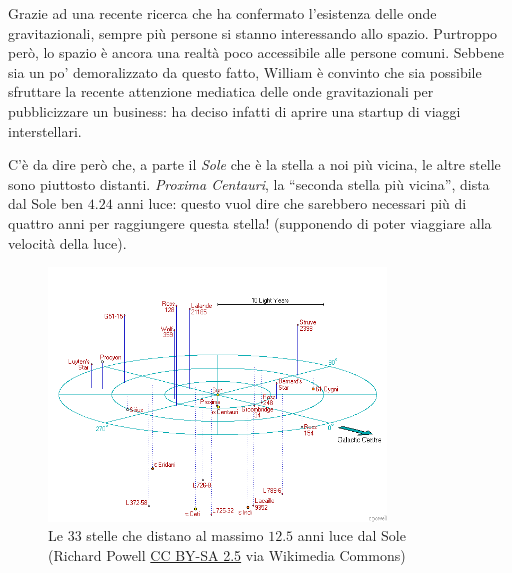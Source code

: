 \usepackage{xcolor}
\usepackage{afterpage}
\usepackage{hyperref}
\usepackage{caption}
\usepackage{pifont,mdframed}
\usepackage[bottom]{footmisc}

\makeatletter
\gdef\this@inputfilename{input.txt}
\gdef\this@outputfilename{output.txt}
\makeatother

\newcommand{\inputfile}{\texttt{input.txt}}
\newcommand{\outputfile}{\texttt{output.txt}}

\newenvironment{warning}
  {\par\begin{mdframed}[linewidth=2pt,linecolor=gray]%
    \begin{list}{}{\leftmargin=1cm
                   \labelwidth=\leftmargin}\item[\Large\ding{43}]}
  {\end{list}\end{mdframed}\par}

  Grazie ad una recente ricerca che ha confermato l'esistenza delle onde gravitazionali, sempre più persone si stanno interessando allo spazio. Purtroppo però, lo spazio è ancora una realtà poco accessibile alle persone comuni. Sebbene sia un po' demoralizzato da questo fatto, William è convinto che sia possibile sfruttare la recente attenzione mediatica delle onde gravitazionali per pubblicizzare un business: ha deciso infatti di aprire una startup di viaggi interstellari.

  C'è da dire però che, a parte il \emph{Sole} che è la stella a noi più vicina, le altre stelle sono piuttosto distanti. \emph{Proxima Centauri}, la ``seconda stella più vicina'', dista dal Sole ben $4.24$ anni luce: questo vuol dire che sarebbero necessari più di quattro anni per raggiungere questa stella! (supponendo di poter viaggiare alla velocità della luce).

  \begin{figure}[h]
    \centering
    \includegraphics[width=0.8\textwidth]{12ly.png}
    \caption*{Le $33$ stelle che distano al massimo $12.5$ anni luce dal Sole \\ \scriptsize (Richard Powell \href{http://creativecommons.org/licenses/by-sa/2.5}{CC BY-SA 2.5} via Wikimedia Commons)}
  \end{figure}

